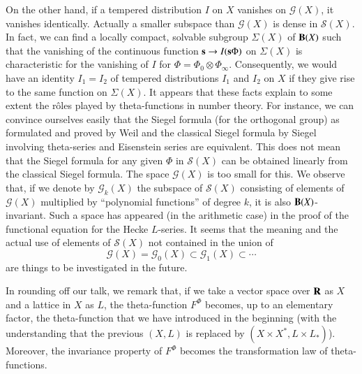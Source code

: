 On the other hand, if a tempered distribution $I$ on $X$ vanishes on $\mathscr{G}(X)$, it vanishes identically. Actually a smaller subspace than $\mathscr{G}(X)$ is dense in $\mathscr{S}(X)$. In fact, we can find a locally compact, solvable subgroup $\Sigma(X)$ of $\mathbf{B}(X)$ such that the vanishing of the continuous function $\mathbf{s}\to I(\mathbf{s}\Phi)$ on $\Sigma(X)$ is characteristic for the vanishing of $I$ for $\Phi=\Phi_{0}\otimes \Phi_{\infty}$. Consequently, we would have an identity $I_{1}=I_{2}$ of tempered distributions $I_{1}$ and $I_{2}$ on $X$ if they give rise to the same function on $\Sigma(X)$. It appears that these facts explain to some extent the r\^oles played by theta-functions in number theory. For instance, we can convince ourselves easily that the Siegel formula (for the orthogonal group) as formulated and proved by Weil \cite{art12-key26} and the classical Siegel formula by Siegel \cite{art12-key22} involving theta-series and Eisenstein series are equivalent. This does not mean that the Siegel formula for any given $\Phi$ in $\mathscr{S}(X)$ can be obtained linearly from the classical Siegel formula. The space $\mathscr{G}(X)$ is too small for this. We observe that, if we denote by $\mathscr{G}_{k}(X)$ the subspace of $\mathscr{S}(X)$ consisting of elements of $\mathscr{G}(X)$ multiplied by ``polynomial functions'' of degree $k$, it is also $\mathbf{B}(X)$-invariant. Such a space has appeared (in the arithmetic case) in the proof of the functional equation for the Hecke $L$-series. It seems that the meaning and the actual use of elements of $\mathscr{S}(X)$ not contained in the union of
$$
\mathscr{G}(X)=\mathscr{G}_{0}(X)\subset \mathscr{G}_{1}(X)\subset \cdots
$$ 
are things to be investigated in the future.

In rounding off our talk, we remark that, if we take a vector space over $\mathbf{R}$ as $X$ and a lattice in $X$ as $L$, the theta-function $F^{\Phi}$ becomes, up to an elementary factor, the theta-function that we have introduced in the beginning (with the understanding that the previous $(X,L)$ is replaced by $(X\times X^{*}, L\times L_{*})$). Moreover, the invariance property of $F^{\Phi}$ becomes the transformation law of theta-functions.

\newpage

